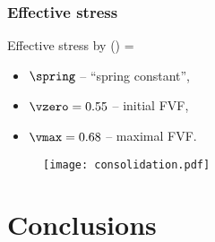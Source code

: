\documentclass[compress]{beamer}%
\newenvironment{myalign}
{\align\color{\notcolor}}
{
  \nonumber
  \endalign
  \vspace{-1em}
}
\begin{document}
\begin{frame}
  \frametitle{Effective stress}

      Effective stress by \citet{Gutowski1987}
      \begin{myalign}
        \efstress(\vfrac) = \spring
      \end{myalign}
      \begin{itemize}
      \item $\spring$ -- ``spring constant'',
      \item $\vzero = 0.55$ -- initial FVF,
      \item $\vmax = 0.68$ -- maximal FVF.
      \end{itemize}

      \begin{figure}
  \centering
  \texttt{[image: consolidation.pdf]}
  \label{fig:consolidation}
\end{figure}
\end{frame}

\section{Conclusions}
\end{document}
